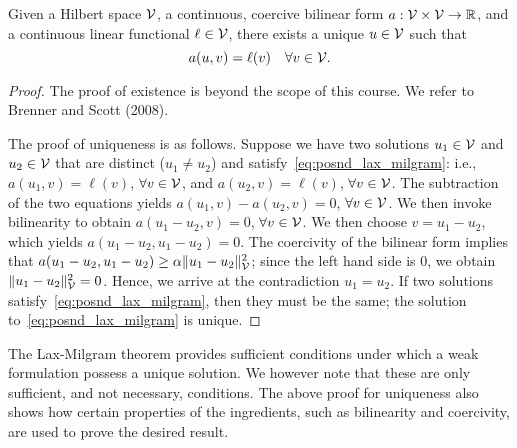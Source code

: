 \begin{theorem}
  \label{thm:lax_milgram}
  Given a Hilbert space $\mathcal{V}$, a continuous, coercive bilinear form $a: \mathcal{V} \times \mathcal{V} \to \mathbb{R}$, and a continuous linear functional $\ell \in \mathcal{V}$, there exists a unique $u \in \mathcal{V}$ such that
  \begin{equation}
    a(u,v) = \ell(v) \quad \forall v \in \mathcal{V}.
    \label{eq:posnd_lax_milgram}
  \end{equation}
  \begin{proof}
    The proof of existence is beyond the scope of this course.  We refer to Brenner and Scott (2008).

    The proof of uniqueness is as follows. Suppose we have two solutions $u_1 \in \mathcal{V}$ and $u_2 \in \mathcal{V}$ that are distinct ($u_1 \neq u_2$) and satisfy~\eqref{eq:posnd_lax_milgram}: i.e., $a(u_1,v) = \ell(v)$, $\forall v \in \mathcal{V}$, and $a(u_2,v) = \ell(v)$, $\forall v \in \mathcal{V}$. The subtraction of the two equations yields $a(u_1,v) - a(u_2,v) = 0$, $\forall v \in \mathcal{V}$.  We then invoke bilinearity to obtain $a(u_1 - u_2,v) = 0$, $\forall v \in \mathcal{V}$. We then choose $v = u_1 - u_2$, which yields $a(u_1 - u_2, u_1 - u_2) = 0$.  The coercivity of the bilinear form implies that $a(u_1 - u_2, u_1 - u_2) \geq \alpha \| u_1 - u_2 \|^2_{\mathcal{V}}$; since the left hand side is $0$, we obtain $\| u_1 - u_2 \|^2_{\mathcal{V}} = 0$.  Hence, we arrive at the contradiction $u_1 = u_2$.  If two solutions satisfy~\eqref{eq:posnd_lax_milgram}, then they must be the same; the solution to~\eqref{eq:posnd_lax_milgram} is unique.
  \end{proof}
\end{theorem}
The Lax-Milgram theorem provides sufficient conditions under which a weak formulation possess a unique solution.  We however note that these are only sufficient, and not necessary, conditions.  The above proof for uniqueness also shows how certain properties of the ingredients, such as bilinearity and coercivity, are used to prove the desired result. 

